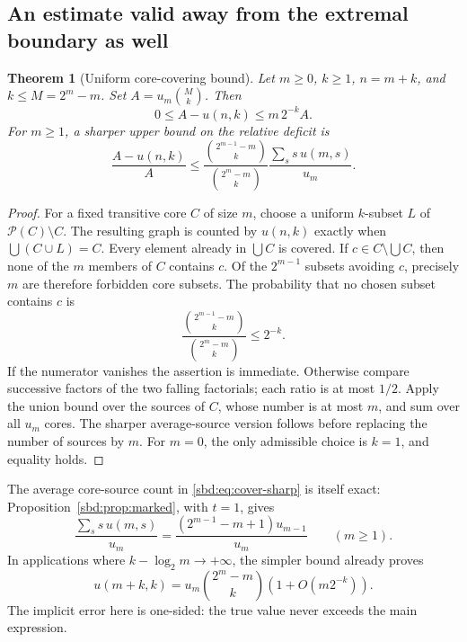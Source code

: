 \documentclass[11pt,a4paper]{article}
\newtheorem{theorem}{Theorem}[section]
\theoremstyle{definition}
\newcommand{\PP}{\mathcal P}
\begin{document}
\subsection{An estimate valid away from the extremal boundary as well}
\begin{theorem}[Uniform core-covering bound]\label{sbd:thm:cover}
Let $m\ge0$, $k\ge1$, $n=m+k$, and $k\le M=2^m-m$.
Set $A=u_m\binom Mk$. Then
\begin{equation}\label{sbd:eq:cover}
 \boxed{\quad 0\le A-u(n,k)\le m\,2^{-k}A.\quad}
\end{equation}
For $m\ge1$, a sharper upper bound on the relative deficit is
\begin{equation}\label{sbd:eq:cover-sharp}
 \frac{A-u(n,k)}{A}
 \le\frac{\binom{2^{m-1}-m}{k}}{\binom{2^m-m}{k}}
 \frac{\sum_s s\,u(m,s)}{u_m}.
\end{equation}
\end{theorem}
\begin{proof}
For a fixed transitive core $C$ of size $m$, choose a uniform $k$-subset
$L$ of $\PP(C)\setminus C$. The resulting graph is counted by $u(n,k)$
exactly when $\bigcup(C\cup L)=C$.
Every element already in $\bigcup C$ is covered. If
$c\in C\setminus\bigcup C$, then none of the $m$ members of $C$ contains
$c$. Of the $2^{m-1}$ subsets avoiding $c$, precisely $m$ are therefore
forbidden core subsets. The probability that no chosen subset contains
$c$ is
\[
 \frac{\binom{2^{m-1}-m}{k}}{\binom{2^m-m}{k}}\le2^{-k}.
\]
If the numerator vanishes the assertion is immediate. Otherwise compare
successive factors of the two falling factorials; each ratio is at most
$1/2$. Apply the union bound over the sources of $C$, whose number is
at most $m$, and sum over all $u_m$ cores. The sharper average-source
version follows before replacing the number of sources by $m$.
For $m=0$, the only admissible choice is $k=1$, and equality holds.
\end{proof}

The average core-source count in \eqref{sbd:eq:cover-sharp} is itself exact:
Proposition~\ref{sbd:prop:marked}, with $t=1$, gives
\begin{equation}\label{sbd:eq:mean-sources}
 \frac{\sum_s s\,u(m,s)}{u_m}
 =\frac{(2^{m-1}-m+1)u_{m-1}}{u_m}\qquad(m\ge1).
\end{equation}
In applications where $k-\log_2m\to+\infty$, the simpler bound already
proves
\begin{equation}\label{sbd:eq:general-equivalent}
 u(m+k,k)=u_m\binom{2^m-m}{k}
 \left(1+O(m2^{-k})\right).
\end{equation}
The implicit error here is one-sided: the true value never exceeds the
main expression.
\end{document}
